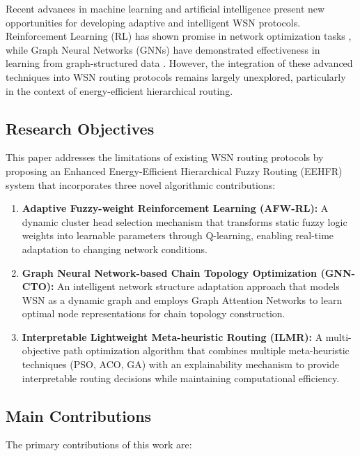 \documentclass[conference]{IEEEtran}
\begin{document}
Recent advances in machine learning and artificial intelligence present new opportunities for developing adaptive and intelligent WSN protocols. Reinforcement Learning (RL) has shown promise in network optimization tasks \cite{luong2019applications}, while Graph Neural Networks (GNNs) have demonstrated effectiveness in learning from graph-structured data \cite{wu2020comprehensive}. However, the integration of these advanced techniques into WSN routing protocols remains largely unexplored, particularly in the context of energy-efficient hierarchical routing.

\subsection{Research Objectives}

This paper addresses the limitations of existing WSN routing protocols by proposing an Enhanced Energy-Efficient Hierarchical Fuzzy Routing (EEHFR) system that incorporates three novel algorithmic contributions:

\begin{enumerate}
    \item \textbf{Adaptive Fuzzy-weight Reinforcement Learning (AFW-RL):} A dynamic cluster head selection mechanism that transforms static fuzzy logic weights into learnable parameters through Q-learning, enabling real-time adaptation to changing network conditions.
    
    \item \textbf{Graph Neural Network-based Chain Topology Optimization (GNN-CTO):} An intelligent network structure adaptation approach that models WSN as a dynamic graph and employs Graph Attention Networks to learn optimal node representations for chain topology construction.
    
    \item \textbf{Interpretable Lightweight Meta-heuristic Routing (ILMR):} A multi-objective path optimization algorithm that combines multiple meta-heuristic techniques (PSO, ACO, GA) with an explainability mechanism to provide interpretable routing decisions while maintaining computational efficiency.
\end{enumerate}

\subsection{Main Contributions}

The primary contributions of this work are:
\end{document}
